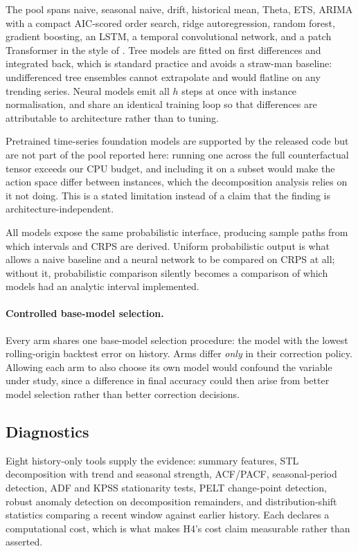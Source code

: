 The pool spans naive, seasonal naive, drift, historical mean, Theta, ETS, ARIMA with a
compact AIC-scored order search, ridge autoregression, random forest, gradient boosting,
an LSTM, a temporal convolutional network, and a patch Transformer in the style of
\citet{patchtst2023}. Tree models are
fitted on first differences and integrated back, which is standard practice and avoids a
straw-man baseline: undifferenced tree ensembles cannot extrapolate and would flatline
on any trending series. Neural models emit all $h$ steps at once with instance
normalisation, and share an identical training loop so that differences are attributable
to architecture rather than to tuning.

Pretrained time-series foundation models \citep{chronos2024} are supported by the
released code but are not part of the pool reported here: running one across the full
counterfactual tensor exceeds our CPU budget, and including it on a subset would make
the action space differ between instances, which the decomposition analysis relies on it
not doing. This is a stated limitation instead of a claim that the finding is
architecture-independent.

All models expose the same probabilistic interface, producing sample paths from which
intervals and CRPS are derived. Uniform probabilistic output is what allows a naive
baseline and a neural network to be compared on CRPS at all; without it, probabilistic
comparison silently becomes a comparison of which models had an analytic interval
implemented.

\paragraph{Controlled base-model selection.}
Every arm shares one base-model selection procedure: the model with the lowest
rolling-origin backtest error on history. Arms differ \emph{only} in their correction
policy. Allowing each arm to also choose its own model would confound the variable under
study, since a difference in final accuracy could then arise from better model selection
rather than better correction decisions.

\subsection{Diagnostics}

Eight history-only tools supply the evidence: summary features, STL decomposition with
trend and seasonal strength, ACF/PACF, seasonal-period detection, ADF and KPSS
stationarity tests, PELT change-point detection, robust anomaly detection on
decomposition remainders, and distribution-shift statistics comparing a recent window
against earlier history. Each declares a computational cost, which is what makes H4's
cost claim measurable rather than asserted.

